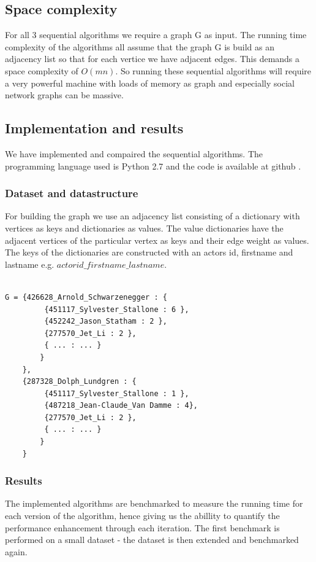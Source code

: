 \documentclass{article}
\begin{document}
\subsection{Space complexity}
For all 3 sequential algorithms we require a graph G as input. The running time complexity of the algorithms all assume that the graph G is build as an adjacency list so that for each vertice we have adjacent edges. This demands a space complexity of $O(mn)$. So running these sequential algorithms will require a very powerful machine with loads of memory as graph and especially social network graphs can be massive.


\subsection{Implementation and results}
We have implemented and compaired the sequential algorithms. The programming language used is Python 2.7 and the code is available at github \cite{gitcode}.

\subsubsection{Dataset and datastructure}
For building the graph we use an adjacency list consisting of a dictionary with vertices as keys and dictionaries as values. The value dictionaries have the adjacent vertices of the particular vertex as keys and their edge weight as values. The keys of the dictionaries are constructed with an actors id, firstname and lastname e.g. $actorid\_firstname\_lastname$.

\begin{lstlisting}

G = {426628_Arnold_Schwarzenegger : {
 		 {451117_Sylvester_Stallone : 6 },
 		 {452242_Jason_Statham : 2 },
 		 {277570_Jet_Li : 2 },
 		 { ... : ... }
 		}
 	},	
	{287328_Dolph_Lundgren : {
		 {451117_Sylvester_Stallone : 1 },
		 {487218_Jean-Claude_Van Damme : 4},
	 	 {277570_Jet_Li : 2 },
	 	 { ... : ... }
	 	}
	}
 \end{lstlisting}

\subsubsection{Results}

The implemented algorithms are benchmarked to measure the running time for each version of the algorithm, hence giving us the abillity to quantify the performance enhancement through each iteration. The first benchmark is performed on a small dataset - the dataset is then extended and benchmarked again.\newline
\end{document}

